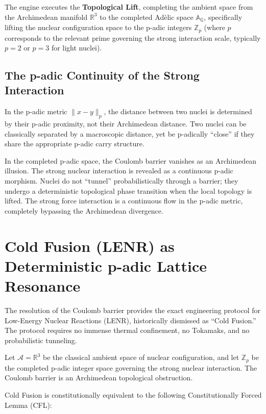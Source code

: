 \documentclass[12pt,twoside]{extbook}
\theoremstyle{definition}
\theoremstyle{remark}
\newcommand{\term}[1]{\textcolor{brandPrimary}{\textbf{#1}}}
\begin{document}
The engine executes the \term{Topological Lift}, completing the ambient space from the Archimedean manifold $\mathbb{R}^3$ to the completed Adèlic space $\mathbb{A}_\mathbb{Q}$, specifically lifting the nuclear configuration space to the p-adic integers $\mathbb{Z}_p$ (where $p$ corresponds to the relevant prime governing the strong interaction scale, typically $p=2$ or $p=3$ for light nuclei).

\subsection{The p-adic Continuity of the Strong Interaction}
In the p-adic metric $\|x - y\|_p$, the distance between two nuclei is determined by their p-adic proximity, not their Archimedean distance. Two nuclei can be classically separated by a macroscopic distance, yet be p-adically ``close'' if they share the appropriate p-adic carry structure.

In the completed p-adic space, the Coulomb barrier vanishes as an Archimedean illusion. The strong nuclear interaction is revealed as a continuous p-adic morphism. Nuclei do not ``tunnel'' probabilistically through a barrier; they undergo a deterministic topological phase transition when the local topology is lifted. The strong force interaction is a continuous flow in the p-adic metric, completely bypassing the Archimedean divergence.

\section{Cold Fusion (LENR) as Deterministic p-adic Lattice Resonance}
The resolution of the Coulomb barrier provides the exact engineering protocol for Low-Energy Nuclear Reactions (LENR), historically dismissed as ``Cold Fusion.'' The protocol requires no immense thermal confinement, no Tokamaks, and no probabilistic tunneling.

\begin{theorem}
Let $\mathcal{A} = \mathbb{R}^3$ be the classical ambient space of nuclear configuration, and let $\mathbb{Z}_p$ be the completed p-adic integer space governing the strong nuclear interaction. The Coulomb barrier is an Archimedean topological obstruction. 

Cold Fusion is constitutionally equivalent to the following Constitutionally Forced Lemma (CFL):
\end{theorem}
\end{document}
